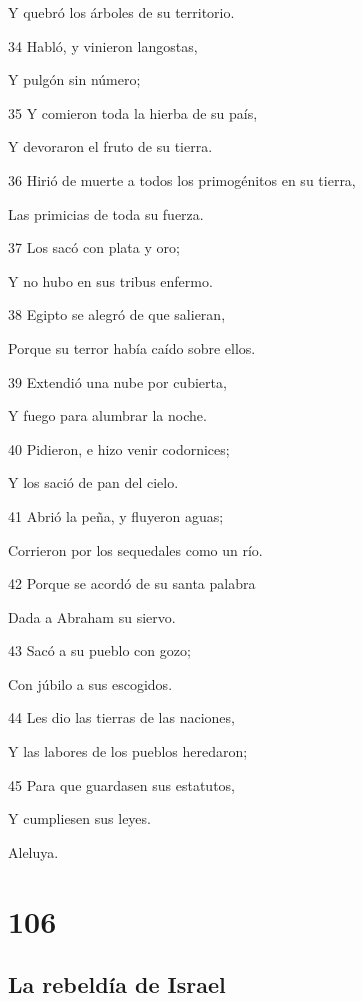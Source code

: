 \par Y quebró los árboles de su territorio.
\par 34 Habló, y vinieron langostas,
\par Y pulgón sin número;
\par 35 Y comieron toda la hierba de su país,
\par Y devoraron el fruto de su tierra.
\par 36 Hirió de muerte a todos los primogénitos en su tierra,
\par Las primicias de toda su fuerza.
\par 37 Los sacó con plata y oro;
\par Y no hubo en sus tribus enfermo.
\par 38 Egipto se alegró de que salieran,
\par Porque su terror había caído sobre ellos.
\par 39 Extendió una nube por cubierta,
\par Y fuego para alumbrar la noche.
\par 40 Pidieron, e hizo venir codornices;
\par Y los sació de pan del cielo.
\par 41 Abrió la peña, y fluyeron aguas;
\par Corrieron por los sequedales como un río.
\par 42 Porque se acordó de su santa palabra
\par Dada a Abraham su siervo.
\par 43 Sacó a su pueblo con gozo;
\par Con júbilo a sus escogidos.
\par 44 Les dio las tierras de las naciones,
\par Y las labores de los pueblos heredaron;
\par 45 Para que guardasen sus estatutos,
\par Y cumpliesen sus leyes.
\par Aleluya.

\chapter{106}

\section*{La rebeldía de Israel}

